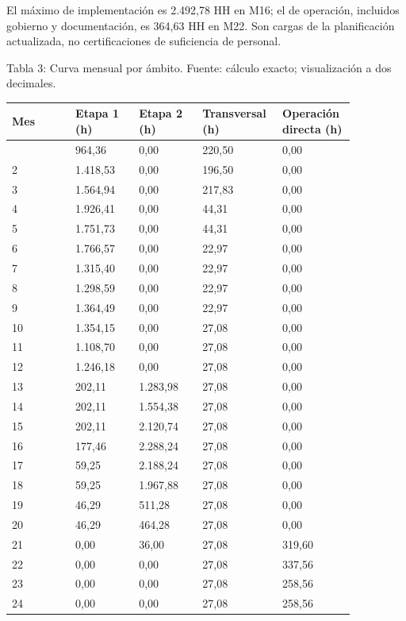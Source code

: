 El máximo de implementación es 2.492,78 HH en M16; el de operación, incluidos gobierno y documentación, es 364,63 HH en M22. Son cargas de la planificación actualizada, no certificaciones de suficiencia de personal.

Tabla 3: Curva mensual por ámbito. Fuente: cálculo exacto; visualización a dos decimales.

\begin{longtable}{@{}p{0.171\linewidth}p{0.171\linewidth}p{0.171\linewidth}p{0.171\linewidth}p{0.171\linewidth}@{}}
\toprule
\textbf{Mes} & \textbf{Etapa 1 (h)} & \textbf{Etapa 2 (h)} & \textbf{Transversal (h)} & \textbf{Operación directa (h)} \\
\midrule
\endhead
\bottomrule
\endlastfoot
1 & 964,36 & 0,00 & 220,50 & 0,00 \\
2 & 1.418,53 & 0,00 & 196,50 & 0,00 \\
3 & 1.564,94 & 0,00 & 217,83 & 0,00 \\
4 & 1.926,41 & 0,00 & 44,31 & 0,00 \\
5 & 1.751,73 & 0,00 & 44,31 & 0,00 \\
6 & 1.766,57 & 0,00 & 22,97 & 0,00 \\
7 & 1.315,40 & 0,00 & 22,97 & 0,00 \\
8 & 1.298,59 & 0,00 & 22,97 & 0,00 \\
9 & 1.364,49 & 0,00 & 22,97 & 0,00 \\
10 & 1.354,15 & 0,00 & 27,08 & 0,00 \\
11 & 1.108,70 & 0,00 & 27,08 & 0,00 \\
12 & 1.246,18 & 0,00 & 27,08 & 0,00 \\
13 & 202,11 & 1.283,98 & 27,08 & 0,00 \\
14 & 202,11 & 1.554,38 & 27,08 & 0,00 \\
15 & 202,11 & 2.120,74 & 27,08 & 0,00 \\
16 & 177,46 & 2.288,24 & 27,08 & 0,00 \\
17 & 59,25 & 2.188,24 & 27,08 & 0,00 \\
18 & 59,25 & 1.967,88 & 27,08 & 0,00 \\
19 & 46,29 & 511,28 & 27,08 & 0,00 \\
20 & 46,29 & 464,28 & 27,08 & 0,00 \\
21 & 0,00 & 36,00 & 27,08 & 319,60 \\
22 & 0,00 & 0,00 & 27,08 & 337,56 \\
23 & 0,00 & 0,00 & 27,08 & 258,56 \\
24 & 0,00 & 0,00 & 27,08 & 258,56 \\

\end{longtable}

